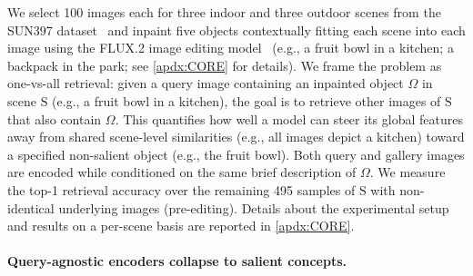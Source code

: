 We select 100 images each for three indoor and three outdoor scenes from the SUN397 dataset~\cite{Herranz2016_SUNdataset} and inpaint 
five objects contextually fitting each scene into each image
using the FLUX.2 image editing model~\cite{flux-2-2025}
(e.g., a fruit bowl in a kitchen; a backpack in the park; see \ref{apdx:CORE} for details).
We frame the problem as one-vs-all retrieval: given a query image containing an inpainted object $\Omega$ in scene $\text{S}$ (e.g., a fruit bowl in a kitchen), the goal is to retrieve other images of $\text{S}$ that also contain $\Omega$.
This quantifies how well a model can steer its global features away from shared scene-level similarities (e.g., all images depict a kitchen) toward a specified non-salient object (e.g., the fruit bowl).
Both query and gallery images are encoded while conditioned on the same brief description of $\Omega$.
We measure the top-1 retrieval accuracy over the remaining 495 samples of $\text{S}$ with non-identical underlying images (pre-editing). %
Details about the experimental setup and results on a per-scene basis are reported in \ref{apdx:CORE}.


\paragraph{Query-agnostic encoders collapse to salient concepts.}


